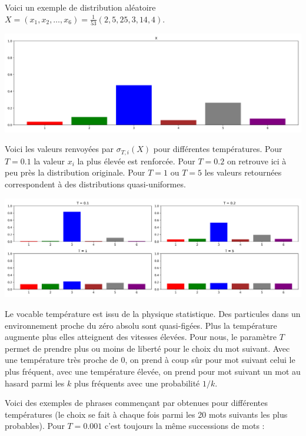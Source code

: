 \documentclass[11pt,class=report,crop=false]{standalone}
\begin{document}
Voici un exemple de distribution aléatoire $X = (x_1,x_2,\ldots,x_6) = \frac{1}{53}(2,5,25,3,14,4)$.
\begin{center}
	\includegraphics[scale=\myscale,scale=0.4]{figures/softmax-03}
\end{center}

Voici les valeurs renvoyées par $\sigma_{T,i}(X)$ pour différentes températures. Pour $T=0.1$ la valeur $x_i$ la plus élevée est renforcée. Pour $T=0.2$ on retrouve ici à peu près la distribution originale. Pour $T=1$ ou $T=5$ les valeurs retournées correspondent à des distributions quasi-uniformes. 
\begin{center}
	\includegraphics[scale=\myscale,scale=0.4]{figures/softmax-04}
\end{center}

Le vocable \og{}température\fg{} est issu de la physique statistique. Des particules dans un environnement proche du zéro absolu sont quasi-figées. Plus la température augmente plus elles atteignent des vitesses élevées.
Pour nous, le paramètre $T$ permet de prendre plus ou moins de liberté pour le choix du mot suivant. Avec une température très proche de $0$, on prend à coup sûr 
pour mot suivant celui le plus fréquent, avec une température élevée, on prend pour mot suivant un mot au hasard parmi les $k$ plus fréquents avec une probabilité $1/k$.

Voici des exemples de phrases commençant par  obtenues pour différentes températures (le choix se fait à chaque fois parmi les 20 mots suivants les plus probables).
Pour $T=0.001$ c'est toujours la même successions de mots :
\end{document}
